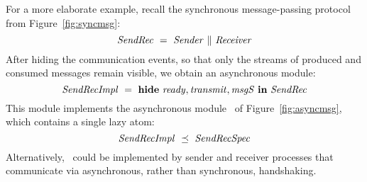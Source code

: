 \mypar
For a more elaborate example, recall the synchronous message-passing protocol
from Figure~\ref{fig:syncmsg}:
  \[{\it SendRec\/}\ =\ {\it Sender\/}\ \|\ {\it Receiver\/}\]
After hiding the communication events, so that only the streams of produced
and consumed messages remain visible, we obtain an asynchronous module:
  \[\SRImpl\ =\ \HIDE\ \ready,\transmit,\msgS\ \IN\ \SR\]
This module implements the asynchronous module \SRSpec\ of
Figure~\ref{fig:asyncmsg}, which contains a single lazy atom:
  \[\SRImpl\ \refines\ \SRSpec\]
Alternatively, \SRSpec\ could be implemented by sender and receiver processes
that communicate via asynchronous, rather than synchronous, handshaking.
